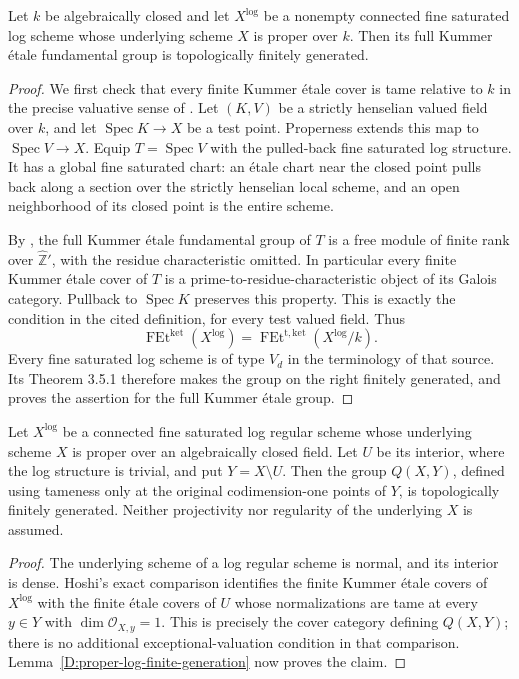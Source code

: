 \begin{lemma}
\label{D:proper-log-finite-generation}
Let $k$ be algebraically closed and let $X^{\log}$ be a nonempty
connected fine saturated log scheme whose underlying scheme $X$
is proper over $k$.  Then its full Kummer \'etale fundamental
group is topologically finitely generated.
\end{lemma}
\begin{proof}
We first check that every finite Kummer \'etale cover is tame
relative to $k$ in the precise valuative sense of
\cite[Definition 3.2.4]{AHLS2026}.  Let $(K,V)$ be a strictly
henselian valued field over $k$, and let
$\operatorname{Spec}K\to X$ be a test point.  Properness extends
this map to $\operatorname{Spec}V\to X$.  Equip
$T=\operatorname{Spec}V$ with the pulled-back fine saturated
log structure.  It has a global fine saturated chart: an
\'etale chart near the closed point pulls back along a section
over the strictly henselian local scheme, and an open
neighborhood of its closed point is the entire scheme.

By \cite[Proposition 3.1.8]{AHLS2026}, the full Kummer \'etale
fundamental group of $T$ is a free module of finite rank over
$\widehat{\mathbb Z}'$, with the residue characteristic omitted.
In particular every finite Kummer \'etale cover of $T$ is a
prime-to-residue-characteristic object of its Galois category.
Pullback to $\operatorname{Spec}K$ preserves this property.
This is exactly the condition in the cited definition, for
every test valued field.  Thus
\[
 \operatorname{FEt}^{\mathrm{ket}}(X^{\log})
   =\operatorname{FEt}^{\mathrm{t,ket}}(X^{\log}/k).
\]
Every fine saturated log scheme is of type $V_d$ in the
terminology of that source.  Its Theorem 3.5.1 therefore makes
the group on the right finitely generated, and proves the
assertion for the full Kummer \'etale group.
\end{proof}

\begin{proposition}
\label{D:log-regular-boundary}
Let $X^{\log}$ be a connected fine saturated log regular scheme
whose underlying scheme $X$ is proper over an algebraically
closed field.  Let $U$ be its interior, where the log structure
is trivial, and put $Y=X\setminus U$.  Then the group $Q(X,Y)$,
defined using tameness only at the original codimension-one
points of $Y$, is topologically finitely generated.
Neither projectivity nor regularity of the underlying $X$ is
assumed.
\end{proposition}
\begin{proof}
The underlying scheme of a log regular scheme is normal, and
its interior is dense.  Hoshi's exact comparison
\cite[Proposition A.10, pp. 57--58]{Hoshi2006B} identifies the
finite Kummer \'etale covers of $X^{\log}$ with the finite
\'etale covers of $U$ whose normalizations are tame at every
$y\in Y$ with $\dim\mathcal O_{X,y}=1$.  This is precisely the
cover category defining $Q(X,Y)$; there is no additional
exceptional-valuation condition in that comparison.
Lemma~\ref{D:proper-log-finite-generation} now proves the claim.
\end{proof}

